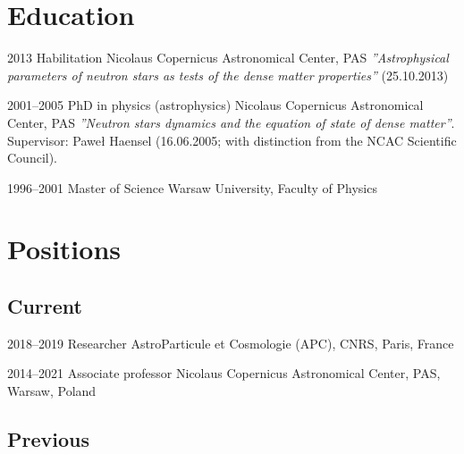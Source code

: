 \documentclass[]{friggeri-cv} %
\begin{document}

\section{Education}
\begin{entrylist}
\entry
{2013}
{Habilitation}
{Nicolaus Copernicus Astronomical Center, PAS} 
{{ \it ''Astrophysical parameters of neutron stars as tests of the dense matter properties''} (25.10.2013)} 

\entry
{2001--2005}
{PhD {\normalfont in physics (astrophysics)}}
{Nicolaus Copernicus Astronomical Center, PAS}
{{\it ''Neutron stars dynamics and the equation of state of dense matter''}. Supervisor: Paweł Haensel (16.06.2005; with distinction from the NCAC Scientific Council).} 

\entry
{1996--2001}
{Master {\normalfont of Science}}
{Warsaw University, Faculty of Physics}

\end{entrylist}


\section{Positions}
\subsection{Current}
\begin{entrylist}

\entry
{2018--2019}
{Researcher}
{AstroParticule et Cosmologie (APC), CNRS, Paris, France}

\entry
{2014--2021}
{Associate professor}
{Nicolaus Copernicus Astronomical Center, PAS, Warsaw, Poland}

\end{entrylist}

\subsection{Previous}
\end{document}
